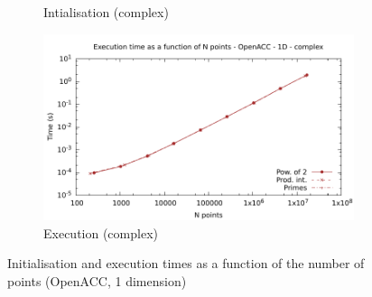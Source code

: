 \documentclass[12pt, a4paper]{article}
\begin{document}
\begin{figure}[H]
\begin{subfigure}{.5\textwidth}
\caption{Intialisation (complex)}
\label{FFTACC1DCI}
\end{subfigure}%
\begin{subfigure}{.5\textwidth}
\centering
\includegraphics[width=.9\linewidth]{graphs/fft-openacc-1d-pow2-c-exec.pdf}
\caption{Execution (complex)}
\label{FFTACC1DCE}
\end{subfigure}
\caption{Initialisation and execution times as a function of the number of points (OpenACC, 1 dimension)}
\label{FFTACC1D}
\end{figure}
\end{document}
